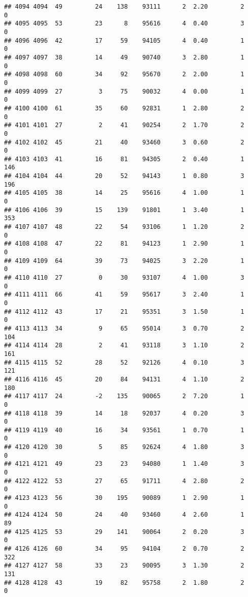 \documentclass[
]{article}
\begin{document}
\begin{verbatim}
## 4094 4094  49         24    138    93111      2  2.20         2        0
## 4095 4095  53         23      8    95616      4  0.40         3        0
## 4096 4096  42         17     59    94105      4  0.40         1        0
## 4097 4097  38         14     49    90740      3  2.80         1        0
## 4098 4098  60         34     92    95670      2  2.00         1        0
## 4099 4099  27          3     75    90032      4  0.00         1        0
## 4100 4100  61         35     60    92831      1  2.80         2        0
## 4101 4101  27          2     41    90254      2  1.70         2        0
## 4102 4102  45         21     40    93460      3  0.60         2        0
## 4103 4103  41         16     81    94305      2  0.40         1      146
## 4104 4104  44         20     52    94143      1  0.80         3      196
## 4105 4105  38         14     25    95616      4  1.00         1        0
## 4106 4106  39         15    139    91801      1  3.40         1      353
## 4107 4107  48         22     54    93106      1  1.20         2        0
## 4108 4108  47         22     81    94123      1  2.90         1        0
## 4109 4109  64         39     73    94025      3  2.20         1        0
## 4110 4110  27          0     30    93107      4  1.00         3        0
## 4111 4111  66         41     59    95617      3  2.40         1        0
## 4112 4112  43         17     21    95351      3  1.50         1        0
## 4113 4113  34          9     65    95014      3  0.70         2      104
## 4114 4114  28          2     41    93118      3  1.10         2      161
## 4115 4115  52         28     52    92126      4  0.10         3      121
## 4116 4116  45         20     84    94131      4  1.10         2      180
## 4117 4117  24         -2    135    90065      2  7.20         1        0
## 4118 4118  39         14     18    92037      4  0.20         3        0
## 4119 4119  40         16     34    93561      1  0.70         1        0
## 4120 4120  30          5     85    92624      4  1.80         3        0
## 4121 4121  49         23     23    94080      1  1.40         3        0
## 4122 4122  53         27     65    91711      4  2.80         2        0
## 4123 4123  56         30    195    90089      1  2.90         1        0
## 4124 4124  50         24     40    93460      4  2.60         1       89
## 4125 4125  53         29    141    90064      2  0.20         3        0
## 4126 4126  60         34     95    94104      2  0.70         2      322
## 4127 4127  58         33     23    90095      3  1.30         2      131
## 4128 4128  43         19     82    95758      2  1.80         2        0

\end{verbatim}
\end{document}
